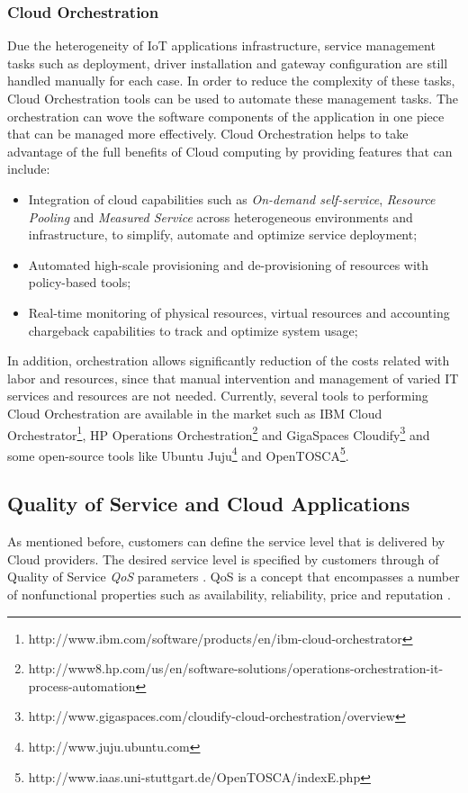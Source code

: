 \subsubsection{Cloud Orchestration}
\label{subs:cloud_orchestration}
Due the heterogeneity of IoT applications infrastructure, service management tasks
such as deployment, driver installation and gateway configuration are still handled
manually for each case. In order to reduce the complexity of these tasks, Cloud Orchestration
tools can be used to automate these management tasks. The orchestration can wove the
software components of the application in one piece that can be managed more effectively.
Cloud Orchestration helps to take advantage of the full benefits of Cloud computing by
providing features that can include:
\begin{itemize}
  \item Integration of cloud capabilities \cite{mell2011nist} such as \textit{On-demand self-service},
  \textit{Resource Pooling} and \textit{Measured Service} across heterogeneous environments and
  infrastructure, to simplify, automate and optimize service deployment;
  \item Automated high-scale provisioning and de-provisioning of resources with policy-based tools;
  \item Real-time monitoring of physical resources, virtual resources and accounting chargeback
  capabilities to track and optimize system usage;
\end{itemize}
In addition, orchestration allows significantly reduction of the costs related with labor
and resources, since that manual intervention and management of varied IT services and resources
are not needed. Currently, several tools to performing Cloud Orchestration are available
in the market such as IBM Cloud Orchestrator\footnote{http://www.ibm.com/software/products/en/ibm-cloud-orchestrator},
HP Operations Orchestration\footnote{http://www8.hp.com/us/en/software-solutions/operations-orchestration-it-process-automation}
and GigaSpaces Cloudify\footnote{http://www.gigaspaces.com/cloudify-cloud-orchestration/overview}
and some open-source tools like Ubuntu Juju\footnote{http://www.juju.ubuntu.com}
and OpenTOSCA\footnote{http://www.iaas.uni-stuttgart.de/OpenTOSCA/indexE.php}.
\subsection{Quality of Service and Cloud Applications}
\label{sub:qos_cloud}
As mentioned before, customers can define the service level that is delivered by
Cloud providers. The desired service level is specified by customers through of
Quality of Service \textit{QoS} parameters \cite{vaquero2008break}. QoS is a concept that
encompasses a number of nonfunctional properties such as availability, reliability, price
and reputation \cite{o2002s}.\\

